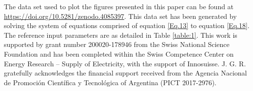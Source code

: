 \documentclass[draft]{agujournal2019}
\begin{document}
%




%
%
%
%
%
%
%
%

\acknowledgments
The data set used to plot the figures presented in this paper can be found at \url{https://doi.org/10.5281/zenodo.4085397}. This data set has been generated by solving  the system of equations comprised of equation \eqref{Eq.13} to equation \eqref{Eq.18}. The reference input parameters are as detailed in Table \ref{table:1}. 
This work is supported by grant number 200020-178946 from the Swiss National Science Foundation and has been completed within the Swiss Competence Center on Energy Research – Supply of Electricity, with the support of Innosuisse. J. G. R. gratefully acknowledges the financial support received from the Agencia Nacional de Promoción Científica y Tecnológica of Argentina (PICT 2017-2976).

%
%

%
\end{document}
